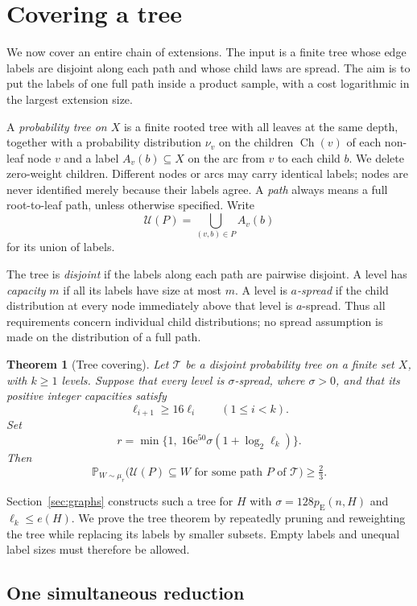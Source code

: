 \documentclass[11pt]{article}
\newtheorem{theorem}{Theorem}[section]
\numberwithin{equation}{section}
\newcommand{\PP}{\mathbb P}
\newcommand{\pE}{p_{\mathrm E}}
\newcommand{\TT}{\mathcal T}
\newcommand{\UU}{\mathcal U}
\newcommand{\ch}{\operatorname{Ch}}
\newcommand{\ee}{\mathrm e}
\begin{document}
\section{Covering a tree}\label{sec:trees}

We now cover an entire chain of extensions. The input is a finite tree
whose edge labels are disjoint along each path and whose child laws are
spread. The aim is to put the labels of one full path inside a product
sample, with a cost logarithmic in the largest extension size.

A \emph{probability tree on $X$} is a finite rooted tree with all
leaves at the same depth, together with a probability distribution
$\nu_v$ on the children $\ch(v)$ of each non-leaf node $v$ and a label
$A_v(b)\subseteq X$ on the arc from $v$ to each child $b$.
We delete zero-weight children. Different nodes or arcs may carry
identical labels; nodes are never identified merely because their
labels agree. A \emph{path} always means a full root-to-leaf path,
unless otherwise specified. Write
\[
 \UU(P)=\bigcup_{(v,b)\in P}A_v(b)
\]
for its union of labels.

The tree is \emph{disjoint} if the labels along each path are pairwise
disjoint. A level has \emph{capacity} $m$ if all its labels have size
at most $m$. A level is \emph{$a$-spread} if the child distribution
at every node immediately above that level is $a$-spread.
Thus all requirements concern individual child distributions;
no spread assumption is made on the distribution of a full path.

\begin{theorem}[Tree covering]\label{thm:tree}
Let $\TT$ be a disjoint probability tree on a finite set $X$,
with $k\ge1$ levels. Suppose that every level is $\sigma$-spread,
where $\sigma>0$, and that its positive integer capacities satisfy
\[
 \ell_{i+1}\ge16\ell_i\qquad(1\le i<k).
\]
Set
\[
 r=\min\{1,\;16\ee^{50}\sigma(1+\log_2\ell_k)\}.
\]
Then
\[
 \PP_{W\sim\mu_r}
 \bigl(\UU(P)\subseteq W\text{ for some path }P\text{ of }\TT\bigr)
 \ge\tfrac23.
\]
\end{theorem}

Section~\ref{sec:graphs} constructs such a tree for $H$ with
$\sigma=128\pE(n,H)$ and $\ell_k\le e(H)$. We prove the tree theorem
by repeatedly pruning and reweighting the tree while replacing its
labels by smaller subsets. Empty labels and unequal label sizes
must therefore be allowed.

\subsection{One simultaneous reduction}
\end{document}
